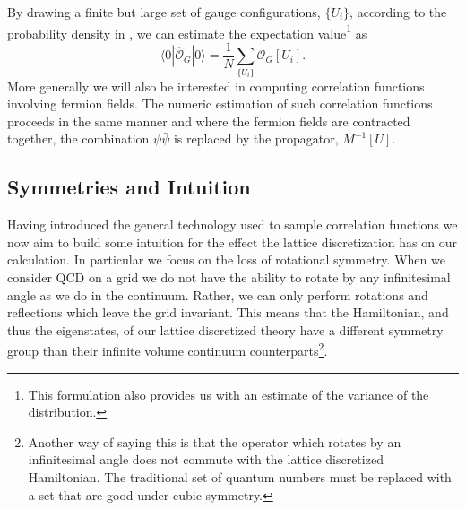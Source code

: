 By drawing a finite but large set of gauge configurations, $\{U_i\}$, according to the probability density in , we can estimate the expectation value\footnote{This formulation also provides us with an estimate of the variance of the distribution.} as 
\begin{equation*}
\langle 0 | \hat{\mathcal{O}}_G  | 0 \rangle = \frac{1}{N} \sum_{\{U_i\}} \mathcal{O}_G[U_i].
\end{equation*}
More generally we will also be interested in computing correlation functions involving fermion fields. The numeric estimation of such correlation functions proceeds in the same manner and where the fermion fields are contracted together, the combination $\psi \bar{\psi}$ is replaced by the propagator, $M^{-1}[U]$. 

 
\subsection{Symmetries and Intuition}

Having introduced the general technology used to sample correlation functions we now aim to build some intuition for the effect the lattice discretization has on our calculation. In particular we focus on the loss of rotational symmetry. When we consider QCD on a grid we do not have the ability to rotate by any infinitesimal angle as we do in the continuum. Rather, we can only perform rotations and reflections which leave the grid invariant. This means that the Hamiltonian, and thus the eigenstates, of our lattice discretized theory have a different symmetry group than their infinite volume continuum counterparts\footnote{Another way of saying this is that the operator which rotates by an infinitesimal angle does not commute with the lattice discretized Hamiltonian. The traditional set of quantum numbers must be replaced with a set that are good under cubic symmetry.}. 


